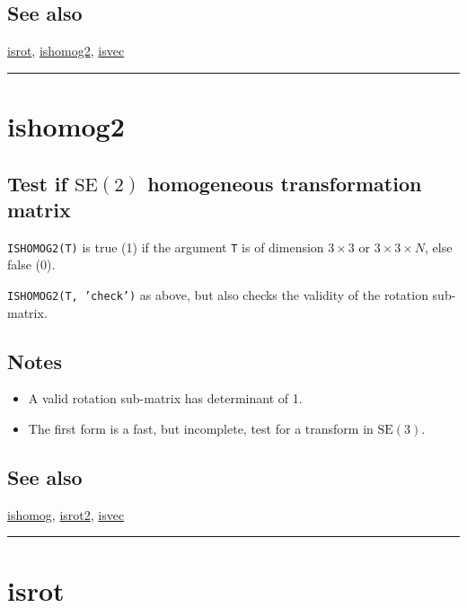 \subsection*{See also}


\hyperlink{isrot}{\color{blue} isrot}, \hyperlink{ishomog2}{\color{blue} ishomog2}, \hyperlink{isvec}{\color{blue} isvec}

\vspace{1.5ex}\rule{\textwidth}{1mm}

\hypertarget{ishomog2}{\section*{ishomog2}}
\subsection*{Test if $\mbox{SE}(2)$ homogeneous transformation matrix}


\texttt{ISHOMOG2(T)} is true (1) if the argument \texttt{T} is of dimension $3 \times 3$ or $3 \times 3 \times N$, else
false (0).



\texttt{ISHOMOG2(T, 'check')} as above, but also checks the validity of the rotation
sub-matrix.


\subsection*{Notes}
\begin{itemize}
  \item A valid rotation sub-matrix has determinant of 1.
  \item The first form is a fast, but incomplete, test for a transform in $\mbox{SE}(3)$.
\end{itemize}

\subsection*{See also}


\hyperlink{ishomog}{\color{blue} ishomog}, \hyperlink{isrot2}{\color{blue} isrot2}, \hyperlink{isvec}{\color{blue} isvec}

\vspace{1.5ex}\rule{\textwidth}{1mm}

\hypertarget{isrot}{\section*{isrot}}
